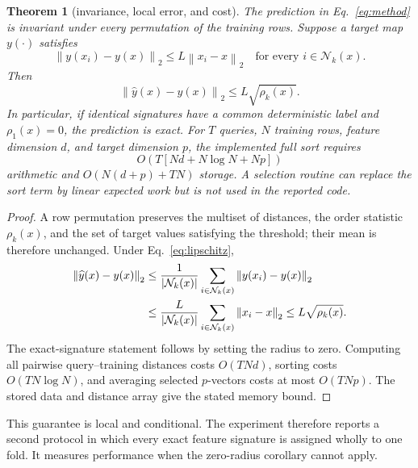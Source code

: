 \documentclass[10pt,letterpaper,twoside]{article}
\newtheorem{theorem}{Theorem}
\newcommand{\norm}[1]{\left\lVert #1\right\rVert}
\begin{document}
\begin{theorem}[invariance, local error, and cost]
\label{thm:neighbor}
The prediction in Eq.~\eqref{eq:method} is invariant under every permutation
of the training rows.  Suppose a target map $y(\cdot)$ satisfies
\begin{equation}
 \norm{y(x_i)-y(x)}_2\le L\norm{x_i-x}_2
 \quad\text{for every }i\in\mathcal N_k(x).           \label{eq:lipschitz}
\end{equation}
Then
\begin{equation}
 \norm{\widehat y(x)-y(x)}_2
 \le L\sqrt{\rho_k(x)}.                              \label{eq:localbound}
\end{equation}
In particular, if identical signatures have a common deterministic label and
$\rho_1(x)=0$, the prediction is exact.  For $T$ queries, $N$ training rows,
feature dimension $d$, and target dimension $p$, the implemented full sort
requires
\begin{equation}
 O\!\left(T[Nd+N\log N+Np]\right)
\end{equation}
arithmetic and $O(N(d+p)+TN)$ storage.  A selection routine can replace the
sort term by linear expected work but is not used in the reported code.
\end{theorem}

\begin{proof}
A row permutation preserves the multiset of distances, the order statistic
$\rho_k(x)$, and the set of target values satisfying the threshold; their mean
is therefore unchanged.  Under Eq.~\eqref{eq:lipschitz},
\begin{align}
 \norm{\widehat y(x)-y(x)}_2
 &\le\frac1{|\mathcal N_k(x)|}
       \sum_{i\in\mathcal N_k(x)}\norm{y(x_i)-y(x)}_2\notag\\
 &\le\frac{L}{|\mathcal N_k(x)|}
       \sum_{i\in\mathcal N_k(x)}\norm{x_i-x}_2
 \le L\sqrt{\rho_k(x)}.
\end{align}
The exact-signature statement follows by setting the radius to zero.  Computing
all pairwise query--training distances costs $O(TNd)$, sorting costs
$O(TN\log N)$, and averaging selected $p$-vectors costs at most $O(TNp)$.
The stored data and distance array give the stated memory bound.
\end{proof}

This guarantee is local and conditional.  The experiment therefore reports a
second protocol in which every exact feature signature is assigned wholly to
one fold.  It measures performance when the zero-radius corollary cannot
apply.
\end{document}
